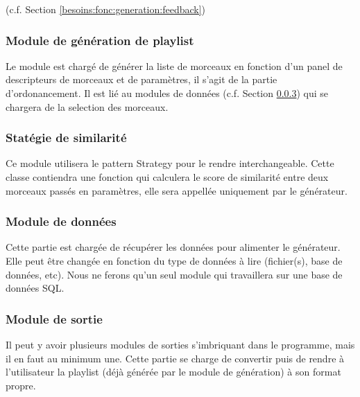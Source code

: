 (c.f. Section \ref{besoins:fonc:generation:feedback})

\subsubsection{Module de génération de playlist}
\label{besoins:nfonc:perf:mod:generator}

Le module est chargé de générer la liste de morceaux en fonction d’un panel de
descripteurs de morceaux et de paramètres, il s'agit de la partie d'ordonancement. 
Il est lié au modules de données (c.f. Section \ref{besoins:nfonc:perf:mod:data}) 
qui se chargera de la selection des morceaux.

\subsubsection{Statégie de similarité}
\label{besoins:nfonc:perf:mod:similarity}

Ce module utilisera le pattern Strategy pour le rendre interchangeable. 
Cette classe contiendra une fonction qui calculera le score de similarité entre 
deux morceaux passés en paramètres, elle sera appellée uniquement par le générateur.

\subsubsection{Module de données}
\label{besoins:nfonc:perf:mod:data}

Cette partie est chargée de récupérer les données pour alimenter le générateur.
Elle peut être changée en fonction du type de données à lire (fichier(s), base de
données, etc). Nous ne ferons qu’un seul module qui travaillera sur une base de
données SQL.

\subsubsection{Module de sortie}
\label{besoins:nfonc:perf:mod:out}

Il peut y avoir plusieurs modules de sorties s'imbriquant dans le programme, mais
il en faut au minimum une. Cette partie se charge de convertir puis de rendre à
l’utilisateur la playlist (déjà générée par le module de génération) à son format
propre.

